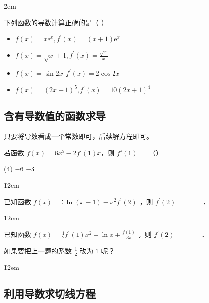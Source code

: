 \v{2em}

\begin{example}
    下列函数的导数计算正确的是（ \quad）
    \begin{itemize}
        \item $f(x)=x \mathrm{e}^x, f^{\prime}(x)=(x+1) \mathrm{e}^x$
        \item $f(x)=\sqrt{x}+1, f^{\prime}(x)=\frac{\sqrt{x}}{x}$
        \item $f(x)=\sin 2 x, f^{\prime}(x)=2 \cos 2 x$
        \item $f(x)=(2 x+1)^5, f^{\prime}(x)=10(2 x+1)^4$
    \end{itemize}
\end{example}

\subsection{含有导数值的函数求导}

\begin{theorem}
    只要将导数看成一个常数即可，后续解方程即可。
\end{theorem}

\begin{example}
    若函数 $f(x) = 6x^{3} - 2f'(1)x$，则 $f'(1) =$ （\quad）
    \begin{tasks}(4)
          \task $- 6$ \task $- 3$
    \end{tasks}
\end{example}

\v{12em}

\begin{example}
    已知函数 $f(x)=3 \ln (x-1)-x^2 f^{\prime}(2)$ ，则 $f^{\prime}(2)=$ \underline{$\qquad$} ．
\end{example}

\v{12em}

\begin{example}
    已知函数 $f(x)=\frac{1}{2} f^{\prime}(1) x^2+\ln x+\frac{f(1)}{3 x}$ ，则 $f^{\prime}(2)=$ \underline{$\qquad$} ．
\end{example}

\begin{problem}
如果要把上一题的系数 $\frac{1}{2} $ 改为 $1$ 呢？
\end{problem}

\v{12em}

\subsection{利用导数求切线方程}

